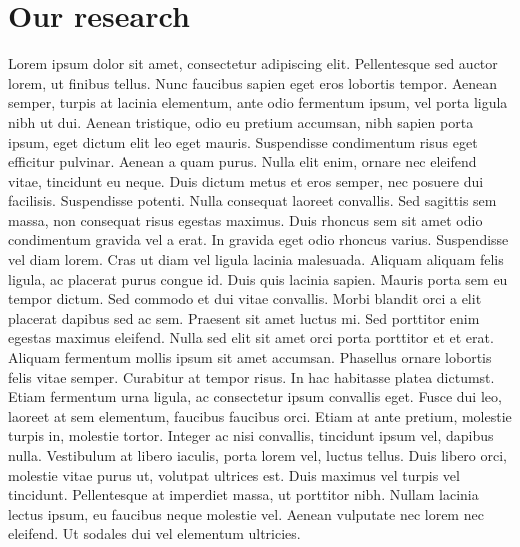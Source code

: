 \documentclass{article}
\begin{document}
\section{Our research}

Lorem ipsum dolor sit amet, consectetur adipiscing elit. Pellentesque sed auctor lorem, ut finibus tellus. Nunc faucibus sapien eget eros lobortis tempor. Aenean semper, turpis at lacinia elementum, ante odio fermentum ipsum, vel porta ligula nibh ut dui. Aenean tristique, odio eu pretium accumsan, nibh sapien porta ipsum, eget dictum elit leo eget mauris. Suspendisse condimentum risus eget efficitur pulvinar. Aenean a quam purus. Nulla elit enim, ornare nec eleifend vitae, tincidunt eu neque. Duis dictum metus et eros semper, nec posuere dui facilisis. Suspendisse potenti. Nulla consequat laoreet convallis. Sed sagittis sem massa, non consequat risus egestas maximus.
Duis rhoncus sem sit amet odio condimentum gravida vel a erat. In gravida eget odio rhoncus varius. Suspendisse vel diam lorem. Cras ut diam vel ligula lacinia malesuada. Aliquam aliquam felis ligula, ac placerat purus congue id. Duis quis lacinia sapien. Mauris porta sem eu tempor dictum. Sed commodo et dui vitae convallis. Morbi blandit orci a elit placerat dapibus sed ac sem. Praesent sit amet luctus mi. Sed porttitor enim egestas maximus eleifend. Nulla sed elit sit amet orci porta porttitor et et erat. Aliquam fermentum mollis ipsum sit amet accumsan. Phasellus ornare lobortis felis vitae semper. Curabitur at tempor risus.
In hac habitasse platea dictumst. Etiam fermentum urna ligula, ac consectetur ipsum convallis eget. Fusce dui leo, laoreet at sem elementum, faucibus faucibus orci. Etiam at ante pretium, molestie turpis in, molestie tortor. Integer ac nisi convallis, tincidunt ipsum vel, dapibus nulla. Vestibulum at libero iaculis, porta lorem vel, luctus tellus. Duis libero orci, molestie vitae purus ut, volutpat ultrices est. Duis maximus vel turpis vel tincidunt. Pellentesque at imperdiet massa, ut porttitor nibh. Nullam lacinia lectus ipsum, eu faucibus neque molestie vel. Aenean vulputate nec lorem nec eleifend. Ut sodales dui vel elementum ultricies.
\end{document}
